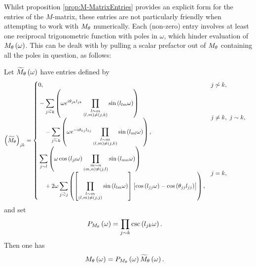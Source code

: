 Whilst proposition \ref{prop:M-MatrixEntries} provides an explicit form for the entries of the $M$-matrix, these entries are not particularly friendly when attempting to work with $M_\theta$ numerically.
Each (non-zero) entry involves at least one reciprocal trigonometric function with poles in $\omega$, which hinder evaluation of $M_\theta\left( \omega \right)$.
This can be dealt with by pulling a scalar prefactor out of $M_\theta$ containing all the poles in question, as follows:
\begin{cory} \label{cory:M-MatrixEntriesNoPoles}
	Let $\widetilde{M}_\theta\left( \omega \right)$ have entries defined by
	\begin{align*}
		\bracs{\widetilde{M}_\qm}_{jk} &= 
		\begin{cases}
			\!\begin{aligned}
				&0,
			\end{aligned}			
			& j \not\con k, \\
			\!\begin{aligned}
				&-\sum_{j\conLeft k} \bracs{ \omega e^{i\qm_{jk}l_{jk}} \prod_{\substack{ l\con m \\ \bracs{l,m} \neq \bracs{j,k} }}\sin\bracs{l_{lm}\omega} }
				\\ &\quad - \sum_{j\conRight k} \bracs{ \omega e^{-i\qm_{kj}l_{kj}} \prod_{\substack{l\con m \\ \bracs{l,m} \neq \bracs{j,k} }}\sin\bracs{l_{ml}\omega} },
			\end{aligned}
			& j\neq k, \ j\con k, \\
			\!\begin{aligned}
				&\sum_{j\con l} \bracs{ \omega\cos\bracs{l_{jl}\omega}\prod_{\substack{ m\con n \\ \bracs{m,n}\neq\bracs{j,l} }}\sin\bracs{l_{mn}\omega} }
				\\ &\quad + 2\omega\sum_{j\conLeft j} \bracs{ \sqbracs{ \prod_{\substack{l\con m \\ \bracs{l,m}\neq\bracs{j,j} }}\sin\bracs{l_{lm}\omega} }\bigl[ \cos\bracs{l_{jj}\omega} - \cos\bracs{\qm_{jj}l_{jj}} \bigr] },
			\end{aligned}
			& j=k,
		\end{cases}
	\end{align*}
	and set
	\begin{align*}
		P_{M_\theta}\left( \omega \right) &= \prod_{j\sim k}\csc\left( l_{jk}\omega \right).
	\end{align*}
	Then one has
	\begin{align*}
		M_\theta\left( \omega \right) &= P_{M_\theta}\left( \omega \right)\widetilde{M}_\theta\left( \omega \right).
	\end{align*}
\end{cory}
